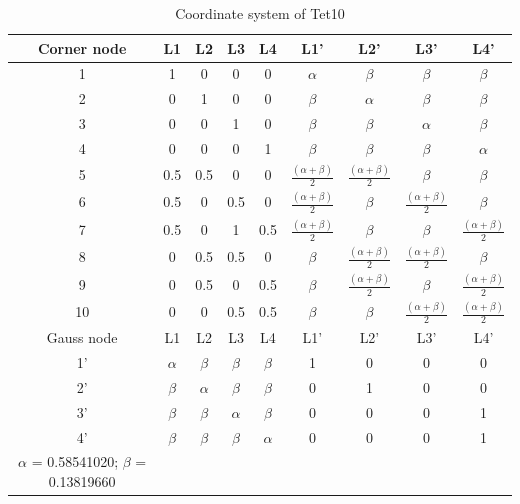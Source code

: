 \begin{table}
	\centering
	\caption{Coordinate system of Tet10} \label{tab: Tet10}
	\begin{tabular}{ccccccccc}			
		\hline
		Corner node\centering& L1& L2& L3& L4& L1'& L2'& L3'& L4'\\ \hline
		1\centering& 1& 0& 0& 0& $\alpha$& $\beta$& $\beta$& $\beta$\\
		2\centering& 0& 1& 0& 0& $\beta$& $\alpha$& $\beta$& $\beta$\\
		3\centering& 0& 0& 1& 0& $\beta$& $\beta$& $\alpha$& $\beta$\\
		4\centering& 0& 0& 0& 1& $\beta$& $\beta$& $\beta$& $\alpha$\\
		5\centering& 0.5& 0.5& 0& 0& $\frac{(\alpha+\beta)}{2}$& $\frac{(\alpha+\beta)}{2}$& $\beta$& $\beta$\\
		6\centering& 0.5& 0& 0.5& 0& $\frac{(\alpha+\beta)}{2}$& $\beta$& $\frac{(\alpha+\beta)}{2}$& $\beta$\\
		7\centering& 0.5& 0& 1& 0.5& $\frac{(\alpha+\beta)}{2}$& $\beta$& $\beta$& $\frac{(\alpha+\beta)}{2}$\\
		8\centering& 0& 0.5& 0.5& 0& $\beta$& $\frac{(\alpha+\beta)}{2}$& $\frac{(\alpha+\beta)}{2}$& $\beta$\\
		9\centering& 0& 0.5& 0& 0.5& $\beta$& $\frac{(\alpha+\beta)}{2}$& $\beta$& $\frac{(\alpha+\beta)}{2}$\\
		10\centering& 0& 0& 0.5& 0.5& $\beta$& $\beta$& $\frac{(\alpha+\beta)}{2}$& $\frac{(\alpha+\beta)}{2}$\\
		\hline
		Gauss node\centering& L1& L2& L3& L4& L1'& L2'& L3'& L4' \\ \hline
		1'\centering& $\alpha$& $\beta$& $\beta$& $\beta$& 1& 0& 0& 0  \\
		2'\centering&$\beta$ & $\alpha$& $\beta$& $\beta$& 0& 1& 0& 0 \\
		3'\centering& $\beta$& $\beta$& $\alpha$& $\beta$& 0& 0& 0& 1\\
		4'\centering& $\beta$& $\beta$& $\beta$& $\alpha$& 0& 0& 0& 1\\
		\hline
		$\alpha$ = 0.58541020; $\beta$ = 0.13819660&&&&&&&&\\
		\hline 		    
	\end{tabular}	
\end{table}		

